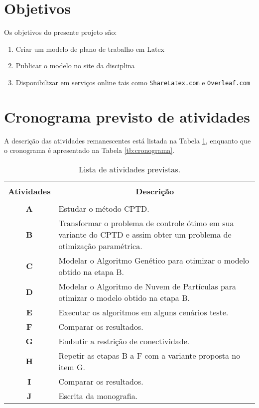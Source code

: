 \documentclass[tcc1,project]{uftex}
\begin{document}
\section*{Objetivos}
Os objetivos do presente projeto são: 
\begin{enumerate}
	\item Criar um modelo de plano de trabalho em Latex 
	\item Publicar o modelo no site da disciplina
	\item Disponibilizar em serviços online tais como \texttt{ShareLatex.com} e \texttt{Overleaf.com}
\end{enumerate}

\section*{Cronograma previsto de atividades \label{sec:crono}}

A descrição das atividades remanescentes está listada na Tabela \ref{tb:atividades}, enquanto que o cronograma é apresentado na Tabela \ref{tb:cronograma}.


\begin{table}[!h]
  \centering
  \caption{Lista de atividades previstas.}\label{tb:atividades}
  \begin{tabular}{cp{9.4cm}}
    \hline \hline &\\[-0.4cm]
    {\bf Atividades} & \multicolumn{1}{c}{\bf Descrição} \\
    \hline
    &\\[-0.4cm]
    \textbf{A} &  Estudar o método CPTD. \\[0.2cm]
    \textbf{B} &  Transformar o problema de controle ótimo em sua variante do CPTD e assim obter um problema de otimização paramétrica.\\[0.2cm]
    \textbf{C} &  Modelar o Algoritmo Genético para otimizar o modelo obtido na etapa B.\\[0.2cm]
    \textbf{D} &  Modelar o Algoritmo de Nuvem de Partículas para otimizar o modelo obtido na etapa B. \\[0.2cm]
    \textbf{E} &  Executar os algoritmos em alguns cenários teste. \\[0.2cm]
    \textbf{F} &  Comparar os resultados.\\[0.2cm]
    \textbf{G} &  Embutir a restrição de conectividade.\\[0.2cm]
    \textbf{H} &  Repetir as etapas B a F com a variante proposta no item G. \\[0.2cm]
    \textbf{I} &  Comparar os resultados. \\[0.2cm]
    \textbf{J} &  Escrita da monografia. \\[0.2cm]
    \hline \hline
  \end{tabular}
\end{table}
\end{document}
